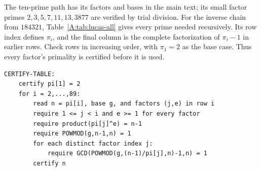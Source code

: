 \documentclass[11pt,a4paper]{article}
\theoremstyle{definition}
\theoremstyle{remark}
\numberwithin{equation}{section}
\begin{document}
The ten-prime path has its factors and bases in the main text; its small
factor primes $2,3,5,7,11,13,3877$ are verified by trial division.
For the inverse chain from $184321$, Table~\ref{A:tab:lucas-all} gives every
prime needed recursively. Its row index defines $\pi_i$, and the final
column is the complete factorization of $\pi_i-1$ in earlier rows. Check
rows in increasing order, with $\pi_1=2$ as the base case. Thus every
factor's primality is certified before it is used.

\begin{verbatim}
CERTIFY-TABLE:
    certify pi[1] = 2
    for i = 2,...,89:
        read n = pi[i], base g, and factors (j,e) in row i
        require 1 <= j < i and e >= 1 for every factor
        require product(pi[j]^e) = n-1
        require POWMOD(g,n-1,n) = 1
        for each distinct factor index j:
            require GCD(POWMOD(g,(n-1)/pi[j],n)-1,n) = 1
        certify n
\end{verbatim}
\end{document}

